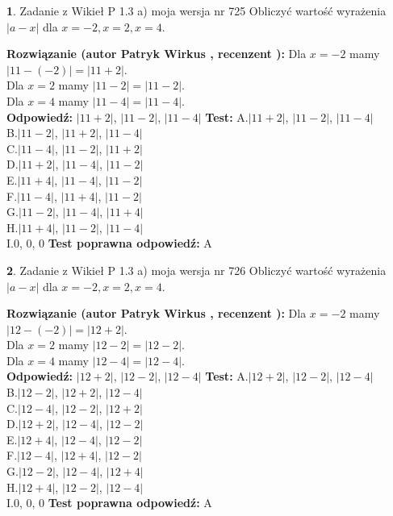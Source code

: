 \documentclass[12pt, a4paper]{article}
\theoremstyle{definition} %
\newtheorem{zad}{}
\newcommand{\zadStart}[1]{\begin{zad}#1\newline}
\newcommand{\zadStop}{\end{zad}}
\newcommand{\rozwStart}[2]{\noindent \textbf{Rozwiązanie (autor #1 , recenzent #2): }\newline}
\newcommand{\rozwStop}{\newline}
\newcommand{\odpStart}{\noindent \textbf{Odpowiedź:}\newline}
\newcommand{\odpStop}{\newline}
\newcommand{\testStart}{\noindent \textbf{Test:}\newline}
\newcommand{\testStop}{\newline}
\newcommand{\kluczStart}{\noindent \textbf{Test poprawna odpowiedź:}\newline}
\newcommand{\kluczStop}{\newline}
\begin{document}
\zadStart{Zadanie z Wikieł P 1.3 a) moja wersja nr 725}
Obliczyć wartość wyrażenia $|a - x|$ dla $x=-2,x=2,x=4$.
\zadStop
\rozwStart{Patryk Wirkus}{}
Dla $x = -2$ mamy $|11 - (-2)| = |11 + 2|$.\\
Dla $x = 2$ mamy $|11 - 2| = |11 - 2|$.\\
Dla $x = 4$ mamy $|11 - 4| = |11 - 4|$.\\
\rozwStop
\odpStart
$|11 + 2|$, $|11 - 2|$, $|11 - 4|$
\odpStop
\testStart
A.$|11 + 2|$, $|11 - 2|$, $|11 - 4|$\\
B.$|11 - 2|$, $|11 + 2|$, $|11 - 4|$\\
C.$|11 - 4|$, $|11 - 2|$, $|11 + 2|$\\
D.$|11 + 2|$, $|11 - 4|$, $|11 - 2|$\\
E.$|11 + 4|$, $|11 - 4|$, $|11 - 2|$\\
F.$|11 - 4|$, $|11 + 4|$, $|11 - 2|$\\
G.$|11 - 2|$, $|11 - 4|$, $|11 + 4|$\\
H.$|11 + 4|$, $|11 - 2|$, $|11 - 4|$\\
I.$0$, $0$, $0$
\testStop
\kluczStart
A
\kluczStop



\zadStart{Zadanie z Wikieł P 1.3 a) moja wersja nr 726}
Obliczyć wartość wyrażenia $|a - x|$ dla $x=-2,x=2,x=4$.
\zadStop
\rozwStart{Patryk Wirkus}{}
Dla $x = -2$ mamy $|12 - (-2)| = |12 + 2|$.\\
Dla $x = 2$ mamy $|12 - 2| = |12 - 2|$.\\
Dla $x = 4$ mamy $|12 - 4| = |12 - 4|$.\\
\rozwStop
\odpStart
$|12 + 2|$, $|12 - 2|$, $|12 - 4|$
\odpStop
\testStart
A.$|12 + 2|$, $|12 - 2|$, $|12 - 4|$\\
B.$|12 - 2|$, $|12 + 2|$, $|12 - 4|$\\
C.$|12 - 4|$, $|12 - 2|$, $|12 + 2|$\\
D.$|12 + 2|$, $|12 - 4|$, $|12 - 2|$\\
E.$|12 + 4|$, $|12 - 4|$, $|12 - 2|$\\
F.$|12 - 4|$, $|12 + 4|$, $|12 - 2|$\\
G.$|12 - 2|$, $|12 - 4|$, $|12 + 4|$\\
H.$|12 + 4|$, $|12 - 2|$, $|12 - 4|$\\
I.$0$, $0$, $0$
\testStop
\kluczStart
A
\kluczStop
\end{document}
